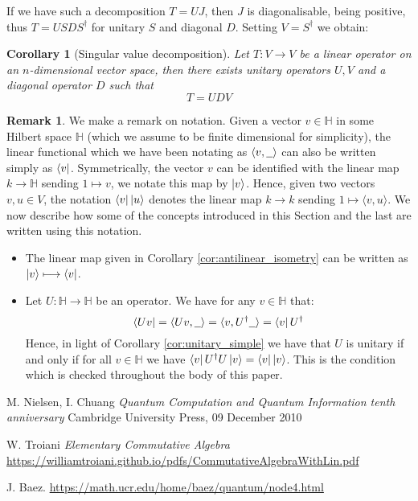 \documentclass[12pt]{article}
\theoremstyle{plain}
\newtheorem{cor}[thm]{Corollary}
\theoremstyle{definition}
\newtheorem{remark}[thm]{Remark}
\newcommand{\bb}[1]{\mathbb{#1}}
\newcommand{\und}[1]{\underline{\hspace{#1 cm}}}
\newcommand{\lto}{\longrightarrow}
\begin{document}
If we have such a decomposition $T = UJ$, then $J$ is diagonalisable, being positive, thus $T = USDS^\dagger$ for unitary $S$ and diagonal $D$. Setting $V = S^\dagger$ we obtain:
\begin{cor}[Singular value decomposition]
	Let $T: V \lto V$ be a linear operator on an $n$-dimensional vector space, then there exists unitary operators $U,V$ and a diagonal operator $D$ such that
	\begin{equation}
		T = UDV
	\end{equation}
\end{cor}

\begin{remark}\label{rmk:notation_bra_ket}
	We make a remark on notation. Given a vector $v \in \bb{H}$ in some Hilbert space $\bb{H}$ (which we assume to be finite dimensional for simplicity), the linear functional which we have been notating as $\langle v, \und{0.2}\rangle$ can also be written simply as $\bra{v}$. Symmetrically, the vector $v$ can be identified with the linear map $k \lto \bb{H}$ sending $1 \longmapsto v$, we notate this map by $\ket{v}$. Hence, given two vectors $v,u \in V$, the notation $\bra{v}\ket{u}$ denotes the linear map $k \lto k$ sending $1 \longmapsto \langle v, u \rangle$. We now describe how some of the concepts introduced in this Section and the last are written using this notation.
	\begin{itemize}
		\item The linear map given in Corollary \ref{cor:antilinear_isometry} can be written as $\ket{v} \longmapsto \bra{v}$.
		\item Let $U: \bb{H} \lto \bb{H}$ be an operator. We have for any $v \in \bb{H}$ that:
		\begin{equation}
			\bra{ Uv} = \langle Uv, \und{0.2}\rangle = \langle v, U^\dagger \und{0.2}\rangle = \bra{v}U^\dagger
		\end{equation}
		Hence, in light of Corollary \ref{cor:unitary_simple} we have that $U$ is unitary if and only if for all $v \in \bb{H}$ we have $\bra{v}U^\dagger U \ket{v} = \bra{v}\ket{v}$. This is the condition which is checked throughout the body of this paper.
	\end{itemize}
\end{remark}
	
	\begin{thebibliography}{9}
		 M. Nielsen, I. Chuang \emph{Quantum Computation and Quantum Information tenth anniversary} Cambridge University Press, 09 December 2010
		
		 W. Troiani \emph{Elementary Commutative Algebra} \url{https://williamtroiani.github.io/pdfs/CommutativeAlgebraWithLin.pdf}
		
		 J. Baez. \url{https://math.ucr.edu/home/baez/quantum/node4.html}
	\end{thebibliography}
\end{document}
